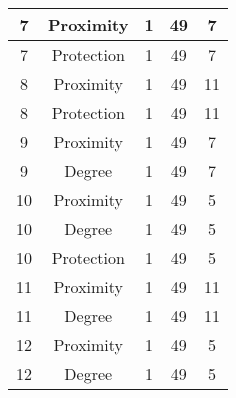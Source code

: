 \documentclass[results.tex]{subfiles}
\begin{document}
\begin{center}
\begin{tabular}{| c || c | c | c | c |}
            \hline
            7                       & Proximity                    & 1                      & 49                      & 7                    \\
            \hline
            7                       & Protection                   & 1                      & 49                      & 7                    \\
            \hline
            8                       & Proximity                    & 1                      & 49                      & 11                   \\
            \hline
            8                       & Protection                   & 1                      & 49                      & 11                   \\
            \hline
            9                       & Proximity                    & 1                      & 49                      & 7                    \\
            \hline
            9                       & Degree                       & 1                      & 49                      & 7                    \\
            \hline
            10                      & Proximity                    & 1                      & 49                      & 5                    \\
            \hline
            10                      & Degree                       & 1                      & 49                      & 5                    \\
            \hline
            10                      & Protection                   & 1                      & 49                      & 5                    \\
            \hline
            11                      & Proximity                    & 1                      & 49                      & 11                   \\
            \hline
            11                      & Degree                       & 1                      & 49                      & 11                   \\
            \hline
            12                      & Proximity                    & 1                      & 49                      & 5                    \\
            \hline
            12                      & Degree                       & 1                      & 49                      & 5                    \\

\end{tabular}
\end{center}
\end{document}
